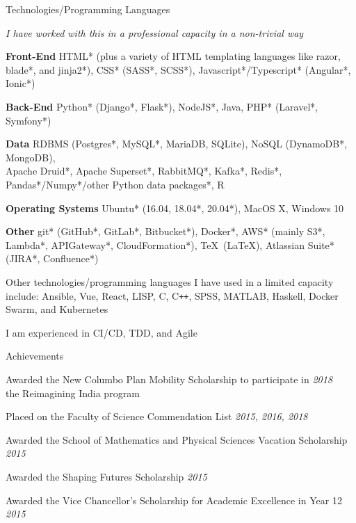 \documentclass{resume} %
\begin{document}

\begin{rSection}{Technologies/Programming Languages}
    \item {\em * I have worked with this in a professional capacity in a non-trivial way}
    \item {\bf Front-End} HTML* (plus a variety of HTML templating languages like razor,
    blade*, and jinja2*), CSS* (SASS*, SCSS*), Javascript*/Typescript* (Angular*, Ionic*)
    \item {\bf Back-End} Python* (Django*, Flask*), NodeJS*, Java, PHP* (Laravel*, Symfony*)
    \item {\bf Data} RDBMS (Postgres*, MySQL*, MariaDB, SQLite), NoSQL (DynamoDB*, MongoDB),
    \\ Apache Druid*, Apache Superset*, RabbitMQ*, Kafka*, Redis*, Pandas*/Numpy*/other Python data packages*, R
    \item {\bf Operating Systems} Ubuntu* (16.04, 18.04*, 20.04*), MacOS X, Windows 10
    \item {\bf Other} git* (GitHub*, GitLab*, Bitbucket*), Docker*, AWS* (mainly S3*, Lambda*, APIGateway*, CloudFormation*), \TeX\ (\LaTeX),
    Atlassian Suite* (JIRA*, Confluence*)
    \item Other technologies/programming languages I have used in a limited capacity include:
    Ansible, Vue, React, LISP, C, C\texttt{++}, SPSS, MATLAB, Haskell, Docker Swarm, and Kubernetes
    \item I am experienced in CI/CD, TDD, and Agile
\end{rSection}


\begin{rSection}{Achievements}
    \item Awarded the New Columbo Plan Mobility Scholarship to participate in \hfill {\em 2018}
    \\ the Reimagining India program
    \item Placed on the Faculty of Science Commendation List \hfill {\em 2015, 2016, 2018}
    \item Awarded the School of Mathematics and Physical Sciences Vacation Scholarship
    \hfill {\em 2015}
    \item Awarded the Shaping Futures Scholarship \hfill {\em 2015} \
    \item Awarded the Vice Chancellor's Scholarship for Academic Excellence in Year 12 \hfill {\em 2015}
\end{rSection}
\end{document}

